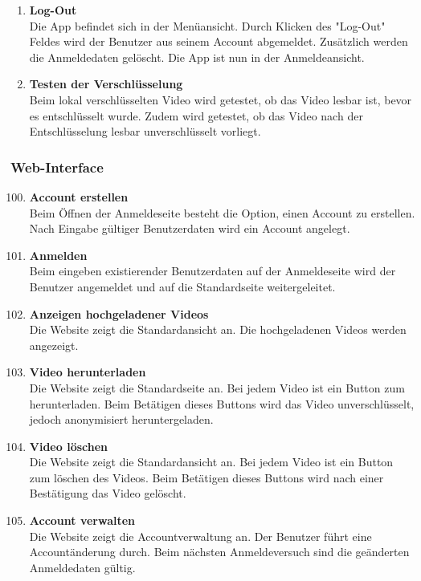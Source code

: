\begin{enumerate}[\bfseries{T}10]
\item \textbf{Log-Out} \hfill\\
Die App befindet sich in der Men\"uansicht. Durch Klicken des "Log-Out" Feldes wird der Benutzer aus seinem Account abgemeldet. Zus\"atzlich werden die Anmeldedaten gel\"oscht. Die App ist nun in der Anmeldeansicht.

\item \textbf{Testen der Verschl\"usselung} \hfill\\
Beim lokal verschl\"usselten Video wird getestet, ob das Video lesbar ist, bevor es entschl\"usselt wurde. Zudem wird getestet, ob das Video nach der Entschl\"usselung lesbar unverschl\"usselt vorliegt.
\end{enumerate}

\subsubsection{Web-Interface}
\begin{enumerate}[\bfseries{T}10]  
\setcounter{enumi}{99}{}
\item \textbf{Account erstellen} \hfill\\
Beim \"Offnen der Anmeldeseite besteht die Option, einen Account zu erstellen. Nach Eingabe g\"ultiger Benutzerdaten wird ein Account angelegt.

\item \textbf{Anmelden} \hfill\\
Beim eingeben existierender Benutzerdaten auf der Anmeldeseite wird der Benutzer angemeldet und auf die Standardseite weitergeleitet.

\item \textbf{Anzeigen hochgeladener Videos} \hfill\\
Die Website zeigt die Standardansicht an. Die hochgeladenen Videos werden angezeigt. 

\item \textbf{Video herunterladen} \hfill\\
Die Website zeigt die Standardseite an. Bei jedem Video ist ein Button zum herunterladen. Beim Bet\"atigen dieses Buttons wird das Video unverschl\"usselt, jedoch anonymisiert heruntergeladen.

\item \textbf{Video l\"oschen} \hfill\\
Die Website zeigt die Standardansicht an. Bei jedem Video ist ein Button zum l\"oschen des Videos. Beim Bet\"atigen dieses Buttons wird nach einer Best\"atigung das Video gel\"oscht.

\item \textbf{Account verwalten} \hfill\\
Die Website zeigt die Accountverwaltung an. Der Benutzer f\"uhrt eine Account\"anderung durch. Beim n\"achsten Anmeldeversuch sind die ge\"anderten Anmeldedaten g\"ultig.
\end{enumerate}

